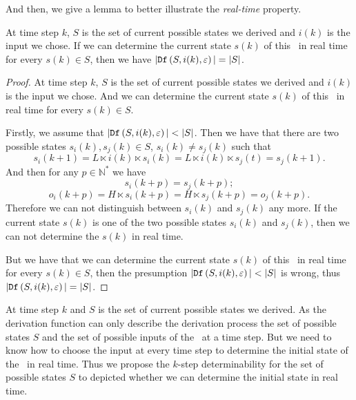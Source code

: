  And then, we give a lemma to better illustrate the {\em real-time} property.
\begin{lemma}
 At time step $k$, $S$ is the set of current possible states we derived and $i(k)$ is the input we chose. If we can determine the current state $s(k)$ of this \BCN\ in real time for every $s(k)\in S$, then we have 
 $|{\tt Df}\left(S,i(k),\varepsilon\right)|=|S|$.
 \label{lemm:1}
\end{lemma}

\begin{proof}
At time step $k$, $S$ is the set of current possible states we derived and $i(k)$ is the input we chose. And we can determine the current state $s(k)$ of this \BCN\ in real time for every $s(k)\in S$. 

Firstly, we assume that $|\Ded\left(S,i(k),\varepsilon\right)|<|S|$. Then we have that there are two possible states $s_i(k), s_j(k)\in S$, $s_i(k)\neq s_j(k)$ such that 
\[s_i(k+1)=L\ltimes i(k)\ltimes s_i(k)=L\ltimes i(k)\ltimes s_j(t)=s_j(k+1).\]
And then for any $p\in \mathbb{N}^*$ we have 
\[s_i(k+p)=s_j(k+p);\]
\[o_i(k+p)= H\ltimes{s_i(k+p)}= H\ltimes{s_j(k+p)}=o_j(k+p).\]
 Therefore we can not distinguish between $s_i(k)$ and $s_j(k)$ any more.
 If the current state $s(k)$ is one of the two possible states $s_i(k)$ and $s_j(k)$, then we can not determine the $s(k)$ in real time. 
 
 But we have that we can determine the current state $s(k)$ of this \BCN\ in real time for every $s(k)\in S$, then the presumption $|\Ded\left(S,i(k),\varepsilon\right)|<|S|$ is wrong, thus $|{\tt Df}\left(S,i(k),\varepsilon\right)|=|S|$.
\end{proof}
 

 At time step $k$ and $S$ is the set of current possible states we derived. As the derivation function can only describe the derivation process the set of possible states $S$ and the set of possible inputs of the \BCN\ at a time step. But we need to know how to choose the input at every time step to determine the initial state of the \BCN\ in real time. Thus we propose the $k$-step determinability for the set of possible states $S$ to depicted whether we can determine the initial state in real time.
